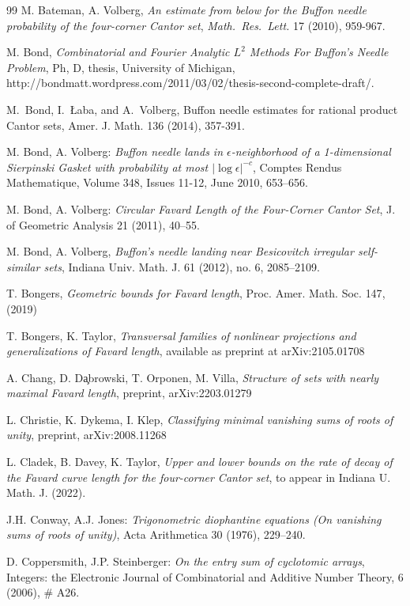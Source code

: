 \begin{thebibliography}{99}
 M. Bateman, A. Volberg, {\it An estimate from below for the Buffon 
needle probability of the four-corner Cantor set}, {\it Math.\ Res.\ Lett.} {17} (2010), 959-967.


M. Bond, {\it Combinatorial and Fourier Analytic $L^2$ Methods For Buffon's Needle Problem}, Ph, D, thesis, University of Michigan, http://bondmatt.wordpress.com/2011/03/02/thesis-second-complete-draft/.

 M.\ Bond, I.\ {\L}aba, and A.\ Volberg, Buffon needle estimates for rational product Cantor sets, Amer. J. Math. 136 (2014), 357-391.


M. Bond, A. Volberg: {\it Buffon needle lands in $\epsilon$-neighborhood of a 1-dimensional 
Sierpinski Gasket with probability at most $|\log\epsilon|^{-c}$}, Comptes Rendus Mathematique, Volume 348, Issues 11-12, June 2010, 653--656.

M. Bond, A. Volberg: {\it Circular Favard Length of the Four-Corner Cantor Set}, J. of Geometric Analysis 21 (2011), 40--55.

M. Bond, A. Volberg, {\it Buffon's needle landing near Besicovitch irregular self-similar sets},
Indiana Univ. Math. J. 61 (2012), no. 6, 2085--2109.

 T. Bongers, {\it Geometric bounds for Favard length}, Proc. Amer. Math. Soc. {147}, (2019)

 T. Bongers, K. Taylor, {\it Transversal families of nonlinear projections and generalizations of Favard length}, available as preprint at arXiv:2105.01708  

 A. Chang, D. D\c{a}browski, T. Orponen, M. Villa, \textit{Structure of sets with nearly maximal Favard length}, preprint, arXiv:2203.01279

 L. Christie, K. Dykema, I. Klep, {\it Classifying minimal vanishing sums of roots of unity}, preprint, arXiv:2008.11268

 L. Cladek, B. Davey, K. Taylor, \textit{Upper and lower bounds on the rate of decay of the Favard curve length for the four-corner Cantor set}, to appear in Indiana U. Math. J. (2022).

 J.H. Conway, A.J. Jones: {\it Trigonometric diophantine equations (On vanishing sums of roots of unity)}, Acta Arithmetica 30 (1976), 229--240.

 D. Coppersmith, J.P. Steinberger: {\it On the entry sum of cyclotomic arrays}, Integers: the Electronic Journal of Combinatorial and Additive Number Theory, 6 (2006), \# A26.



\end{thebibliography}
